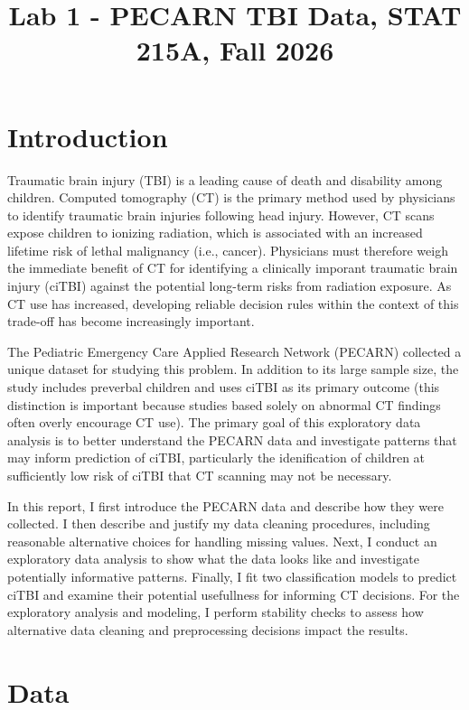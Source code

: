 \documentclass[11pt,letterpaper]{article}
\title{Lab 1 - PECARN TBI Data, STAT 215A, Fall 2026}
\begin{document}
\maketitle

\section{Introduction}\label{introduction}

Traumatic brain injury (TBI) is a leading cause of death and disability among children. 
Computed tomography (CT) is the primary method used by physicians to identify traumatic brain injuries
following head injury. However, CT scans expose children to ionizing radiation, which is 
associated with an increased lifetime risk of lethal malignancy (i.e., cancer).
Physicians must therefore weigh the immediate benefit of CT for identifying a
clinically imporant traumatic brain injury (ciTBI) against the potential long-term
risks from radiation exposure. As CT use has increased, developing reliable decision rules
within the context of this trade-off has become increasingly important.  

The Pediatric Emergency Care Applied Research Network (PECARN) collected a unique dataset 
for studying this problem. In addition to its large sample size, the study includes 
preverbal children and uses ciTBI as its primary outcome (this distinction is important 
because studies based solely on abnormal CT findings often overly encourage
CT use). The primary goal of this exploratory data analysis is to better
understand the PECARN data and investigate patterns that may inform prediction of ciTBI,
particularly the idenification of children at sufficiently low risk of ciTBI 
that CT scanning may not be necessary. 

In this report, I first introduce the PECARN data and describe how they were collected. 
I then describe and justify my data cleaning procedures, including reasonable alternative choices 
for handling missing values. Next, I conduct an exploratory data analysis to show what the data looks like 
and investigate potentially informative patterns. Finally, I fit two classification models
to predict ciTBI and examine their potential usefullness for informing CT decisions.
For the exploratory analysis and modeling, I perform stability checks to assess how 
alternative data cleaning and preprocessing decisions impact the results. 

\section{Data}\label{data}
\end{document}
